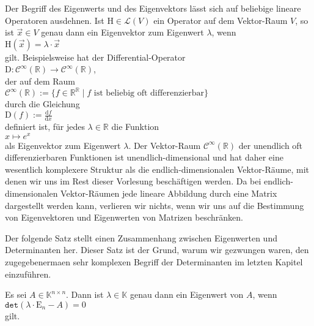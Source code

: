 \remark
Der Begriff des Eigenwerts und des Eigenvektors l\"asst sich auf beliebige lineare Operatoren
ausdehnen.  Ist $\mathrm{H} \in \mathcal{L}(V)$ ein Operator auf dem Vektor-Raum $V$, so ist
$\vec{x} \in V$ genau dann ein Eigenvektor zum Eigenwert $\lambda$, wenn 
\\[0.2cm]
\hspace*{1.3cm}
$\mathrm{H}(\vec{x}) = \lambda \cdot \vec{x}$
\\[0.2cm]
gilt.  Beispielsweise hat der Differential-Operator 
\\[0.2cm]
\hspace*{1.3cm}
$\mathrm{D}: \mathcal{C}^\infty(\mathbb{R}) \rightarrow  \mathcal{C}^\infty(\mathbb{R})$, 
\\[0.2cm]
der auf dem Raum 
\\[0.2cm]
\hspace*{1.3cm}
$\mathcal{C}^\infty(\mathbb{R}) := \bigl\{ f \in \mathbb{R}^\mathbb{R} \mid \mbox{$f$ ist beliebig oft  differenzierbar} \bigr\}$
\\[0.2cm]
durch die Gleichung
\\[0.2cm]
\hspace*{1.3cm}
$\mathrm{D}(f) := \displaystyle\frac{\mathrm{d}f}{\mathrm{d}x}$
\\[0.2cm]
definiert ist, f\"ur jedes $\lambda \in \mathbb{R}$ die Funktion
\\[0.2cm]
\hspace*{1.3cm}
 $x \mapsto e^x$ 
\\[0.2cm]
als Eigenvektor zum Eigenwert $\lambda$.  
Der Vektor-Raum $\mathcal{C}^\infty(\mathbb{R})$ der unendlich oft differenzierbaren Funktionen ist
unendlich-dimensional und hat daher eine wesentlich komplexere Struktur als die
endlich-dimensionalen Vektor-R\"aume, mit denen wir uns im Rest dieser Vorlesung besch\"aftigen werden.
Da bei endlich-dimensionalen Vektor-R\"aumen jede lineare Abbildung durch eine Matrix dargestellt
werden kann, verlieren wir nichts, wenn wir uns auf die Bestimmung von Eigenvektoren und Eigenwerten
von Matrizen beschr\"anken. 
\eox

Der folgende Satz stellt einen Zusammenhang zwischen Eigenwerten und Determinanten her.  Dieser Satz
ist der Grund, warum wir gezwungen waren, den zugegebenerma\3en sehr komplexen Begriff der
Determinanten im letzten Kapitel einzuf\"uhren.

\begin{Satz}
  Es sei $A \in \mathbb{K}^{n \times n}$.  Dann ist $\lambda \in \mathbb{K}$ genau dann ein
  Eigenwert von $A$, wenn 
  \\[0.2cm]
  \hspace*{1.3cm}
  $\mathtt{det}(\lambda \cdot \mathrm{E}_n - A) = 0$
  \\[0.2cm]
  gilt. 
\end{Satz}


